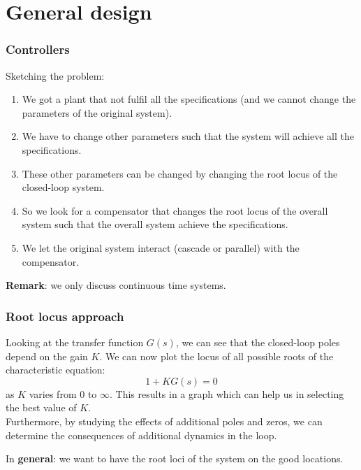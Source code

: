\section{General design}

\begin{frame}
	\frametitle{Controllers}
		Sketching the problem:
		\begin{enumerate}
			\item We got a plant that not fulfil all the specifications (and we cannot change the parameters of the original system).
			\item We have to change other parameters such that the system will achieve all the specifications.
			\item These other parameters can be changed by changing the root locus of the closed-loop system. 
			\item So we look for a compensator that changes the root locus of the overall system such that the overall system achieve the specifications. 
			\item We let the original system interact (cascade or parallel) with the compensator.
		\end{enumerate}
		\vspace{3mm}
		
		\textbf{Remark}: we only discuss continuous time systems. 
\end{frame}

\begin{frame}
	\frametitle{Root locus approach}
	Looking at the transfer function $G(s)$, we can see that the closed-loop poles depend on the gain $K$. We can now plot the locus of all possible roots of the characteristic equation: 
		$$1 + KG(s) = 0 $$
	as $K$ varies from $0$ to $\infty$. This results in a graph which can help us in selecting the best value of $K$.\\
	\vspace{1em}
	Furthermore, by studying the effects of additional poles and zeros, we can determine the consequences of additional dynamics in the loop. 
	\vspace{2mm}
	
	In \textbf{general}: we want to have the root loci of the system on the good locations.
\end{frame}

